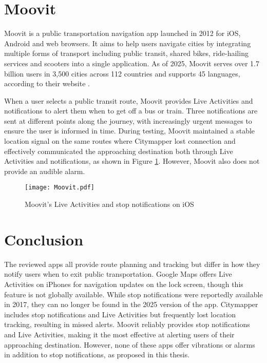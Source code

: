 \section{Moovit}
Moovit is a public transportation navigation app launched in 2012 for iOS, Android and web browsers.
It aims to help users navigate cities by integrating multiple forms of transport including public transit, shared bikes, ride-hailing services and scooters into a single application.
As of 2025, Moovit serves over 1.7 billion users in 3,500 cities across 112 countries and supports 45 languages, according to their website \cite{moovit_about}.

When a user selects a public transit route, Moovit provides Live Activities and notifications to alert them when to get off a bus or train.
Three notifications are sent at different points along the journey, with increasingly urgent messages to ensure the user is informed in time.
During testing, Moovit maintained a stable location signal on the same routes where Citymapper lost connection and effectively communicated the approaching destination both through Live Activities and notifications, as shown in Figure \ref{fig:Moovit}.
However, Moovit also does not provide an audible alarm.

\begin{figure}[htbp]
    \centering
    \texttt{[image: Moovit.pdf]}
    \caption{Moovit's Live Activities and stop notifications on iOS}
    \label{fig:Moovit}
\end{figure}

\section{Conclusion}
The reviewed apps all provide route planning and tracking but differ in how they notify users when to exit public transportation.
Google Maps offers Live Activities on iPhones for navigation updates on the lock screen, though this feature is not globally available.
While stop notifications were reportedly available in 2017, they can no longer be found in the 2025 version of the app.
Citymapper includes stop notifications and Live Activities but frequently lost location tracking, resulting in missed alerts.
Moovit reliably provides stop notifications and Live Activities, making it the most effective at alerting users of their approaching destination.
However, none of these apps offer vibrations or alarms in addition to stop notifications, as proposed in this thesis.